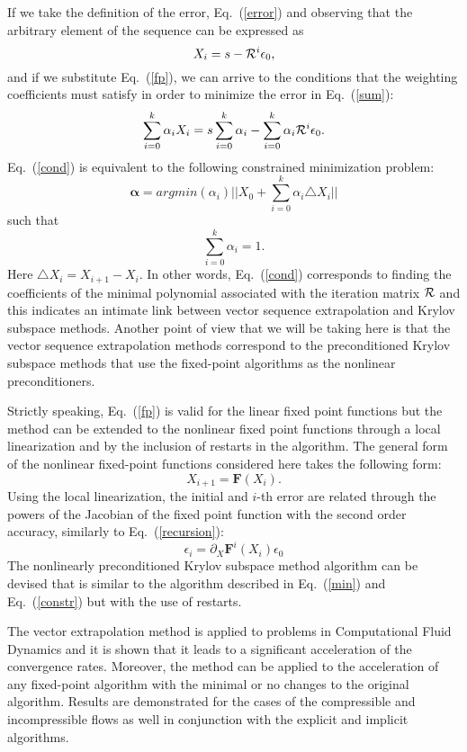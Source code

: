 \documentclass{report}
\begin{document}
If we take the definition of the error, Eq.~(\ref{error}) and
observing that the arbitrary element of the sequence can be
expressed as
\begin{equation}
X_i = s - {\cal R}^i \epsilon_0,
\end{equation}
and if we substitute Eq.~(\ref{fp}), we can arrive to the
conditions that the weighting coefficients must satisfy in order
to minimize the error in Eq.~(\ref{sum}):
\begin{equation}\label{cond}
\sum_{i=0}^{k} \alpha_i X_i = s \sum_{i = 0}^k \alpha_i -
\sum_{i=0}^{k} \alpha_i {\cal R}^i \epsilon_0.
\end{equation}
Eq.~(\ref{cond}) is equivalent to the following constrained
minimization problem:
\begin{equation}\label{min}
\mathbf{\alpha} = argmin(\alpha_i)
|| X_0 + \sum_{i=0}^k \alpha_i \triangle X_i ||
\end{equation}
such that
\begin{equation}\label{constr}
\sum_{i = 0}^k \alpha_i = 1.
\end{equation}
Here $\triangle X_i = X_{i+1} - X_i$.
In other words, Eq.~(\ref{cond}) corresponds to finding the
coefficients of the minimal polynomial associated with the
iteration matrix ${\cal R}$ and this indicates an intimate link
between vector sequence extrapolation and Krylov subspace
methods. Another point of view that we will be taking here is
that the vector sequence extrapolation methods correspond to the
preconditioned Krylov subspace methods that use the fixed-point
algorithms as the nonlinear preconditioners.

Strictly speaking, Eq.~(\ref{fp}) is valid for the linear fixed
point functions but the method can be extended to the nonlinear
fixed point functions through a local linearization and by the
inclusion of restarts in the algorithm. The general form of
the nonlinear fixed-point functions considered here takes the
following form:
\begin{equation}
X_{i+1} = \mathbf{F}\left(X_i\right).
\end{equation}
Using the local linearization, the initial and $i$-th error are
related through the powers of the Jacobian of the fixed point
function with the second order accuracy, similarly to
Eq.~(\ref{recursion}):
\begin{equation}
\epsilon_i = \partial_X \mathbf{F}^i\left(X_i\right) \epsilon_0
\end{equation}
The nonlinearly preconditioned Krylov subspace method algorithm
can be devised that is similar to the algorithm described in
Eq.~(\ref{min}) and Eq.~(\ref{constr}) but with the use of
restarts.

The vector extrapolation method is applied to problems in
Computational Fluid Dynamics and it is shown that it leads to a
significant acceleration of the convergence rates. Moreover, the
method can be applied to the acceleration of any fixed-point
algorithm with the minimal or no changes to the original
algorithm. Results are demonstrated for the cases of the
compressible and incompressible flows as well in conjunction with
the explicit and implicit algorithms.
\end{document}
